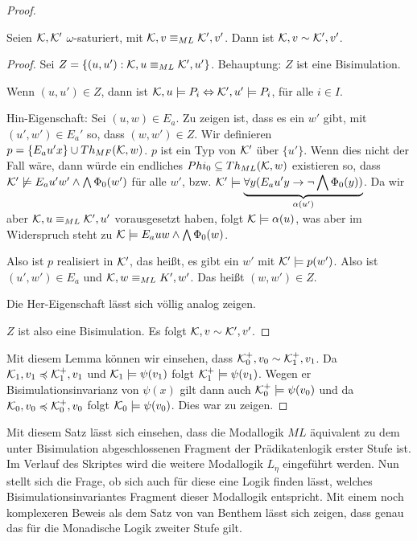 \begin{proof}
	\begin{lemma}
		Seien $\mathcal{K},\mathcal{K}'$ $\omega$-saturiert, mit $\mathcal{K},v\equiv_{ML}\mathcal{K}',v'$. Dann ist $\mathcal{K},v\sim\mathcal{K}',v'$.
	\end{lemma}
	\begin{proof}
		Sei $Z=\{(u,u') : \mathcal{K},u\equiv_{ML} \mathcal{K}',u'\}$. Behauptung: $Z$ ist eine Bisimulation.
		
		Wenn $(u,u')\in Z$, dann ist $\mathcal{K},u\models P_i\Leftrightarrow \mathcal{K}',u'\models P_i$, für alle $i\in I$.
		
		Hin-Eigenschaft: Sei $(u,w)\in E_a$. Zu zeigen ist, dass es ein $w'$ gibt, mit $(u',w')\in E_a'$ so, dass $(w,w')\in Z$. Wir definieren $p=\{E_a u' x\}\cup Th_{MF}(\mathcal{K},w)$. $p$ ist ein Typ von $\mathcal{K}'$ über $\{u'\}$. 
		Wenn dies nicht der Fall wäre, dann würde ein endliches $Phi_0\subseteq Th_{ML}(\mathcal{K},w)$ existieren so, dass $\mathcal{K}'\not\models E_a u' w' \land \bigwedge \Phi_0(w')$ für alle $w'$, bzw. $\mathcal{K}'\models\underbrace{\forall y (E_a u' y \rightarrow \neg \bigwedge\Phi_0(y))}_{\alpha(u')}$. Da wir aber $\mathcal{K},u\equiv_{ML} \mathcal{K}',u'$ vorausgesetzt haben, folgt $\mathcal{K}\models \alpha(u)$, was aber im Widerspruch steht zu $\mathcal{K}\models E_a u w \land \bigwedge\Phi_0(w)$.
		
		Also ist $p$ realisiert in $\mathcal{K}'$, das heißt, es gibt ein $w'$ mit $\mathcal{K}'\models p(w')$. Also ist $(u',w')\in E_a$ und $\mathcal{K},w\equiv_{ML} K',w'$. Das heißt $(w,w')\in Z$.
		
		Die Her-Eigenschaft lässt sich völlig analog zeigen.
		
		$Z$ ist also eine Bisimulation. Es folgt $\mathcal{K},v \sim \mathcal{K}',v'$.
	\end{proof}
	
	Mit diesem Lemma können wir einsehen, dass $\mathcal{K}_0^+,v_0\sim \mathcal{K}_1^+,v_1$.
	Da $\mathcal{K}_1,v_1\preccurlyeq \mathcal{K}_1^+,v_1$ und $\mathcal{K}_1\models\psi(v_1)$ folgt $\mathcal{K}_1^+\models\psi(v_1)$. Wegen er Bisimulationsinvarianz von $\psi(x)$ gilt dann auch $\mathcal{K}_0^+\models\psi(v_0)$ und da $\mathcal{K}_0,v_0\preccurlyeq\mathcal{K}_0^+,v_0$ folgt $\mathcal{K}_0\models\psi(v_0)$. Dies war zu zeigen.
\end{proof}

Mit diesem Satz lässt sich einsehen, dass die Modallogik $ML$ äquivalent zu dem unter Bisimulation abgeschlossenen Fragment der Prädikatenlogik erster Stufe ist. Im Verlauf des Skriptes wird die weitere Modallogik $L_\eta$ eingeführt werden. 
Nun stellt sich die Frage, ob sich auch für diese eine Logik finden lässt, welches Bisimulationsinvariantes Fragment dieser Modallogik entspricht. 
Mit einem noch komplexeren Beweis als dem Satz von van Benthem lässt sich zeigen, dass genau das für die Monadische Logik zweiter Stufe gilt.

